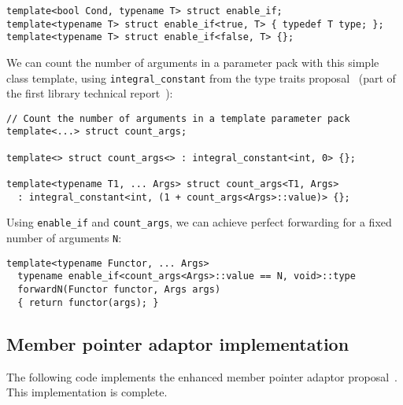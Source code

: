 \documentclass{article}
\begin{document}
\small
\begin{verbatim}
template<bool Cond, typename T> struct enable_if;
template<typename T> struct enable_if<true, T> { typedef T type; };
template<typename T> struct enable_if<false, T> {};
\end{verbatim}
\normalsize

We can count the number of arguments in a parameter pack with this
simple class template, using {\tt integral\_constant} from the type
traits proposal~\cite{Maddock03} (part of the first library technical
report~\cite{Austern03}):

\small
\begin{verbatim}
// Count the number of arguments in a template parameter pack
template<...> struct count_args;

template<> struct count_args<> : integral_constant<int, 0> {};

template<typename T1, ... Args> struct count_args<T1, Args>
  : integral_constant<int, (1 + count_args<Args>::value)> {};
\end{verbatim}
\normalsize

Using \texttt{enable\_if} and \texttt{count\_args}, we can achieve
perfect forwarding for a fixed number of arguments \texttt{N}:
\small
\begin{verbatim}
template<typename Functor, ... Args>
  typename enable_if<count_args<Args>::value == N, void>::type
  forwardN(Functor functor, Args args)
  { return functor(args); }
\end{verbatim}
\normalsize

\subsection{Member pointer adaptor implementation}
\label{mem_fnimpl}
The following code implements the enhanced member pointer adaptor
proposal~\cite{Dimov03a}. This implementation is complete.
\end{document}
